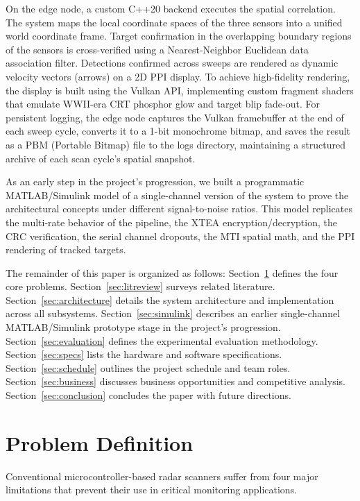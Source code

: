 \documentclass[conference]{IEEEtran}
\begin{document}
On the edge node, a custom C++20 backend executes the spatial correlation. The system maps the local coordinate spaces of the three sensors into a unified world coordinate frame. Target confirmation in the overlapping boundary regions of the sensors is cross-verified using a Nearest-Neighbor Euclidean data association filter. Detections confirmed across sweeps are rendered as dynamic velocity vectors (arrows) on a 2D PPI display. To achieve high-fidelity rendering, the display is built using the Vulkan API, implementing custom fragment shaders that emulate WWII-era CRT phosphor glow and target blip fade-out. For persistent logging, the edge node captures the Vulkan framebuffer at the end of each sweep cycle, converts it to a 1-bit monochrome bitmap, and saves the result as a PBM (Portable Bitmap) file to the logs directory, maintaining a structured archive of each scan cycle's spatial snapshot.

As an early step in the project's progression, we built a programmatic MATLAB/Simulink model of a single-channel version of the system to prove the architectural concepts under different signal-to-noise ratios. This model replicates the multi-rate behavior of the pipeline, the XTEA encryption/decryption, the CRC verification, the serial channel dropouts, the MTI spatial math, and the PPI rendering of tracked targets.

The remainder of this paper is organized as follows: Section~\ref{sec:problem} defines the four core problems. Section~\ref{sec:litreview} surveys related literature. Section~\ref{sec:architecture} details the system architecture and implementation across all subsystems. Section~\ref{sec:simulink} describes an earlier single-channel MATLAB/Simulink prototype stage in the project's progression. Section~\ref{sec:evaluation} defines the experimental evaluation methodology. Section~\ref{sec:specs} lists the hardware and software specifications. Section~\ref{sec:schedule} outlines the project schedule and team roles. Section~\ref{sec:business} discusses business opportunities and competitive analysis. Section~\ref{sec:conclusion} concludes the paper with future directions.

\section{Problem Definition}
\label{sec:problem}
Conventional microcontroller-based radar scanners suffer from four major limitations that prevent their use in critical monitoring applications.
\end{document}
